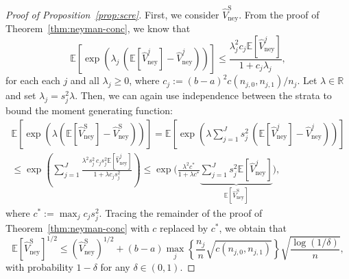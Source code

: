 \documentclass[aos]{imsart2}
\theoremstyle{plain}
\theoremstyle{definition}
\newcommand{\R}{\mathbb{R}}
\newcommand{\E}{\mathbb{E}}
\newcommand{\vhn}{\hat{V}_{\mathrm{ney}}}
\newcommand{\vhns}{\vhn^\mathrm{S}}
\begin{document}
\begin{appendix}
\begin{proof}[Proof of Proposition~\ref{prop:scre}]
    First, we consider $\vhns$. From the proof of Theorem~\ref{thm:neyman-conc}, we know that
    \begin{equation*}
        \E\left[\exp\left(\lambda_j\,(\E[\vhn^j]-\vhn^j)\right)\right] \leq
        \frac{\lambda_j^2c_j\E[\vhn^j]}{1+c_j\lambda_j},
    \end{equation*}
    for each each $j$ and all $\lambda_j \geq 0$, where $c_j := (b-a)^2c(n_{j,0},n_{j,1})/n_j$. Let $\lambda \in\R$ and set $\lambda_j = s_j^2 \lambda$. Then, we can again use independence between the strata to bound the moment generating function:
    \begin{multline*}
        \E\left[\exp\left(\lambda (\E[\vhns]-\vhns)\right)\right] = 
        \E\left[\exp\left(\lambda\sum_{j=1}^J s_j^2\, (\E[\vhn^j]-\vhn^j)\right)\right]\\
        \leq \exp\left(\sum_{j=1}^J \frac{\lambda^2s_j^2\,c_js_j^2 \E[\vhn^j]}{1+\lambda c_j s_j^2}\right)
        \leq \exp\Bigg(\frac{\lambda^2 c^*}{1+\lambda c^*} \underbrace{\sum_{j=1}^J s_j^2 \E[\vhn^j]}_{\E[\vhns]}\Bigg),
    \end{multline*}
    where $c^* := \max_{j} c_j s_j^2$. Tracing the remainder of the proof of Theorem~\ref{thm:neyman-conc} with $c$ replaced by $c^*$, we obtain that
    \begin{equation}\label{eq:neyman-scre}
        \E[\vhns]^{1/2} \leq (\vhns)^{1/2} + (b-a) \max_{j} \left\{\frac{n_j}{n}\sqrt{c(n_{j,0},n_{j,1})}\right\} \sqrt{\frac{\log(1/\delta)}{n}},
    \end{equation}
    with probability $1-\delta$ for any $\delta \in (0,1)$.


\end{proof}
\end{appendix}
\end{document}
